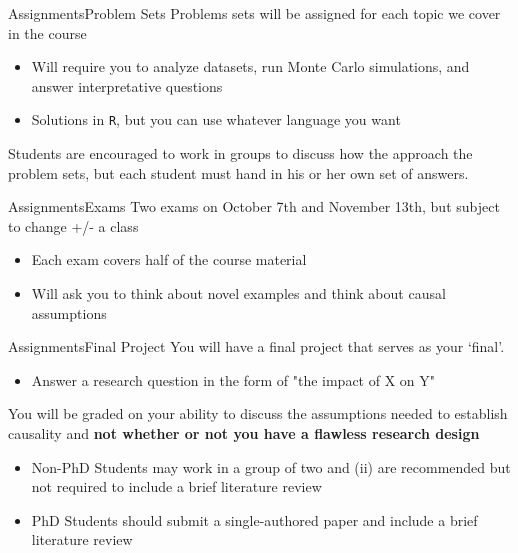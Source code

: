 \documentclass[aspectratio=169,t,11pt,table]{beamer}
\begin{document}
\begin{frame}{Assignments}{Problem Sets}
  Problems sets will be assigned for each topic we cover in the course
  \begin{itemize}
    \item Will require you to analyze datasets, run Monte Carlo simulations, and answer interpretative questions
    \item Solutions in \texttt{R}, but you can use whatever language you want
  \end{itemize}

  \bigskip
  Students are encouraged to work in groups to discuss how the approach the problem sets, but each student must hand in his or her own set of answers. 
\end{frame}

\begin{frame}{Assignments}{Exams}
  Two exams on October 7th and November 13th, but subject to change +/- a class

  \begin{itemize}
    \item Each exam covers half of the course material
    
    \item Will ask you to think about novel examples and think about causal assumptions
  \end{itemize}
\end{frame}

\begin{frame}{Assignments}{Final Project}
  You will have a final project that serves as your `final'.
  \begin{itemize}
    \item Answer a research question in the form of "the impact of X on Y"
  \end{itemize}  

  \bigskip
  You will be graded on your ability to discuss the assumptions needed to establish causality and \textbf{not whether or not you have a flawless research design}
  \begin{itemize}
    \item Non-PhD Students may work in a group of two and (ii) are recommended but not required to include a brief literature review

    \item PhD Students should submit a single-authored paper and include a brief literature review
  \end{itemize}
\end{frame}
\end{document}
